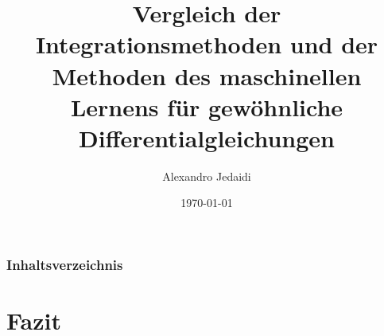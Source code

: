 \documentclass[handout, 10pt]{beamer}
\author{Alexandro Jedaidi}
\title{\textbf{Vergleich der Integrationsmethoden und der Methoden des maschinellen
Lernens für gewöhnliche Differentialgleichungen}}
\date{\today}
\begin{document}
    \begin{frame}
        \titlepage
    \end{frame}

    \begin{frame}
        \frametitle{Inhaltsverzeichnis}
        \tableofcontents
    \end{frame}

    

    


    


    

    \section{Fazit}

    \begin{frame}

    \end{frame}

    \begin{frame}
        \printbibliography[heading=bibintoc]
    \end{frame}

    \begin{frame}
        \listoffigures
    \end{frame}
\end{document}
